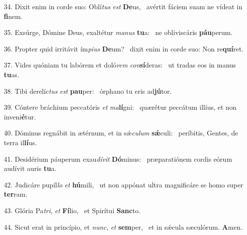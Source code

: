 34. Dixit enim in corde suo: Oblí\textit{tus} \textit{est} \textbf{De}us, \ast\  avértit fáciem suam ne vídeat in \textbf{fi}nem.\

35. Exsúrge, Dómine Deus, exaltétur \textit{ma}\textit{nus} \textbf{tu}a: \ast\  ne obliviscáris \textbf{páu}perum.\

36. Propter quid irritávit ím\textit{pi}\textit{us} \textbf{De}um? \ast\  dixit enim in corde suo: Non re\textbf{quí}ret.\

37. Vides quóniam tu labórem et doló\textit{rem} \textit{con}\textbf{sí}deras: \ast\  ut tradas eos in manus \textbf{tu}as.\

38. Tibi derelíc\textit{tus} \textit{est} \textbf{pau}per: \ast\  órphano tu eris ad\textbf{jú}tor.\

39. Cóntere bráchium peccatóris \textit{et} \textit{ma}\textbf{lí}gni: \ast\  quærétur peccátum illíus, et non inveni\textbf{é}tur.\

40. Dóminus regnábit in ætérnum, et in sǽ\textit{cu}\textit{lum} \textbf{sǽ}culi: \ast\  períbitis, Gentes, de terra il\textbf{lí}us.\

41. Desidérium páuperum exau\textit{dí}\textit{vit} \textbf{Dó}minus: \ast\  præparatiónem cordis eórum audívit auris \textbf{tu}a.\

42. Judicáre pupíl\textit{lo} \textit{et} \textbf{hú}mili, \ast\  ut non appónat ultra magnificáre se homo super \textbf{ter}ram.\

43. Glória Pa\textit{tri}, \textit{et} \textbf{Fí}lio, \ast\  et Spirítui \textbf{Sanc}to.\

44. Sicut erat in princípio, et \textit{nunc}, \textit{et} \textbf{sem}per, \ast\  et in sǽcula sæculórum. \textbf{A}men.\

